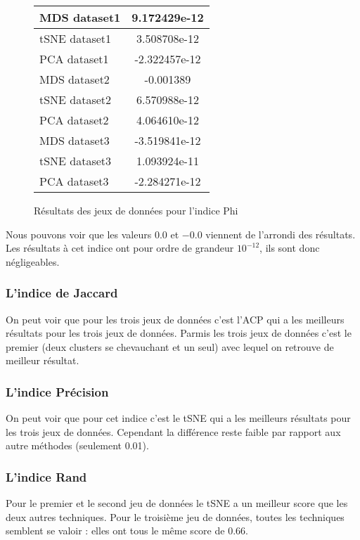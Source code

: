 \begin{center}
    \begin{figure}[!ht]  
        \begin{tabular}{ | l | c | }
            \hline			
            MDS dataset1 & 9.172429e-12 \\ \hline
            tSNE dataset1 & 3.508708e-12 \\ \hline
            PCA dataset1 & -2.322457e-12  \\ \hline
            MDS dataset2 & -0.001389 \\  \hline
            tSNE dataset2 & 6.570988e-12 \\ \hline
            PCA dataset2 & 4.064610e-12 \\ \hline
            MDS dataset3 & -3.519841e-12 \\ \hline
            tSNE dataset3 & 1.093924e-11 \\ \hline
            PCA dataset3 & -2.284271e-12  \\ 
            \hline  
        \end{tabular}
    \caption{Résultats des jeux de données pour l'indice Phi}
    \end{figure}
\end{center}
\smallskip

Nous pouvons voir que les valeurs $0.0$ et $-0.0$ viennent de l'arrondi des résultats. Les résultats à cet indice ont pour ordre de grandeur $10^{-12}$, ils sont
donc négligeables.


\subsubsection{L'indice de Jaccard}
On peut voir que pour les trois jeux de données c'est l'ACP qui a les meilleurs résultats pour les trois jeux de données.
Parmis les trois jeux de données c'est le premier (deux clusters se chevauchant et un seul) avec lequel on retrouve de meilleur résultat.

\subsubsection{L'indice Précision}
On peut voir que pour cet indice c'est le tSNE qui a les meilleurs résultats pour les trois jeux de données.
Cependant la différence reste faible par rapport aux autre méthodes (seulement 0.01).

\subsubsection{L'indice Rand}
Pour le premier et le second jeu de données le tSNE a un meilleur score que les deux autres techniques.
Pour le troisième jeu de données, toutes les techniques semblent se valoir : elles ont tous le même score de 0.66.


